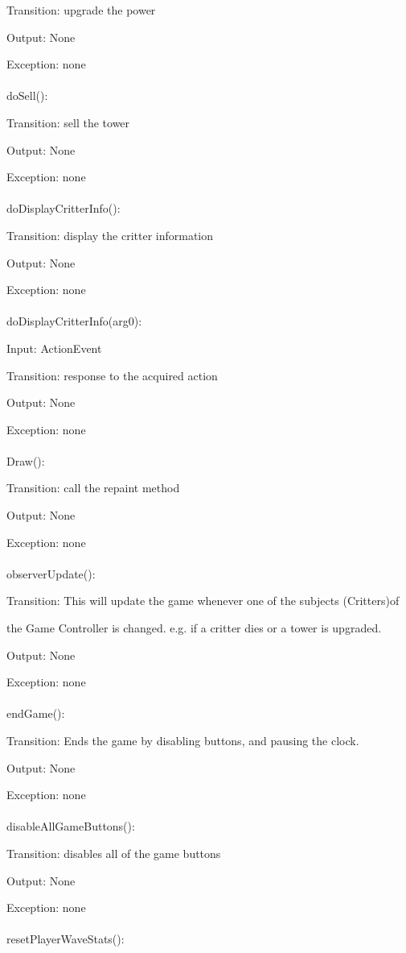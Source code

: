 \documentclass[12,english]{article}
\begin{document}
		Transition: upgrade the power
		
		Output: None
		
		Exception: none\\
		\\
		doSell():
		
		Transition: sell the tower
		
		Output: None
		
		Exception: none\\
		\\
		doDisplayCritterInfo():
		
		Transition: display the critter information
		
		Output: None
		
		Exception: none\\
		\\
		doDisplayCritterInfo(arg0):
		
		Input: ActionEvent
		
		Transition: response to the acquired action
		
		Output: None
		
		Exception: none\\
		\\
		Draw():
		
		Transition: call the repaint method
		
		Output: None
		
		Exception: none\\
		\\
		observerUpdate():
		
		Transition: This will update the game whenever one of the subjects (Critters)of
		
		the Game Controller is changed. e.g. if a critter dies or a tower is upgraded.
		
		Output: None
		
		Exception: none\\
		\\
		endGame():
		
		Transition: Ends the game by disabling buttons, and pausing the clock.
		
		Output: None
		
		Exception: none\\
		\\
		disableAllGameButtons():
		
		Transition: disables all of the game buttons
		
		Output: None
		
		Exception: none\\
		\\
		resetPlayerWaveStats():
		
\end{document}
